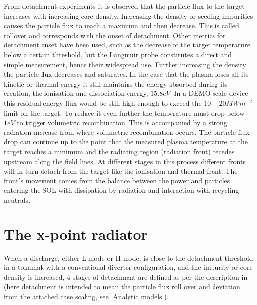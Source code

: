 From detachment experiments it is observed that the particle flux to the target increases with increasing core density. Increasing the density or seeding impurities causes the particle flux to reach a maximum and then decrease. This is called rollover and corresponds with the onset of detachment. Other metrics for detachment onset have been used, such as the decrease of the target temperature below a certain threshold\cite{Stangeby2000,Goldston2017}, but the Langmuir probe constitutes a direct and simple measurement, hence their widespread use. Further increasing the density the particle flux decreases and saturates. In the case that the plasma loses all its kinetic or thermal energy it still maintains the energy absorbed during its creation, the ionisation and dissociation energy, $15.8eV$. In a DEMO scale device this residual energy flux would be still high enough to exceed the $10-20 MWm^{-2}$ limit on the target. \cite{Krasheninnikov2017a} To reduce it even further the temperature must drop below $1eV$ to trigger volumetric recombination. This is accompanied by a strong radiation increase from where volumetric recombination occurs. The particle flux drop can continue up to the point that the measured plasma temperature at the target reaches a minimum and the radiating region (radiation front) recedes upstream along the field lines.\cite{Krasheninnikov1999} At different stages in this process different fronts will in turn detach from the target like the ionisation and thermal front.\cite{Hutchinson1994,Loarte1998,Lipschultz2016} The front's movement comes from the balance between the power and particles entering the SOL with dissipation by radiation and interaction with recycling neutrals.




\section{The x-point radiator}\label{The x-point radiator}

When a discharge, either L-mode or H-mode, is close to the detachment threshold in a tokamak with a conventional divertor configuration, and the impurity or core density is increased, 4 stages of detachment are defined as per the description in \cite{Reimold2015,Potzel2014} (here detachment is intended to mean the particle flux roll over and deviation from the attached case scaling, see \autoref{Analytic models}).

